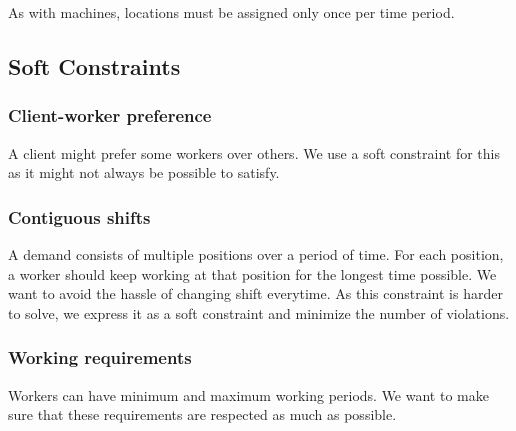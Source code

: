 \documentclass[../thesis.tex]{subfiles}
\begin{document}
As with machines, locations must be assigned only once per time period.




\subsection{Soft Constraints}

\subsubsection{Client-worker preference}

A client might prefer some workers over others. 
We use a soft constraint for this as it might not always be possible to 
satisfy.

\subsubsection{Contiguous shifts}

A demand consists of multiple positions over a period of time. 
For each position, a worker should keep working at that position for the longest time possible. 
We want to avoid the hassle of changing shift everytime. 
As this constraint is harder to solve, we express it as a soft constraint and minimize the number of 
violations.

\subsubsection{Working requirements}

Workers can have minimum and maximum working periods. We want to make sure 
that these requirements are respected as much as possible.
\end{document}

